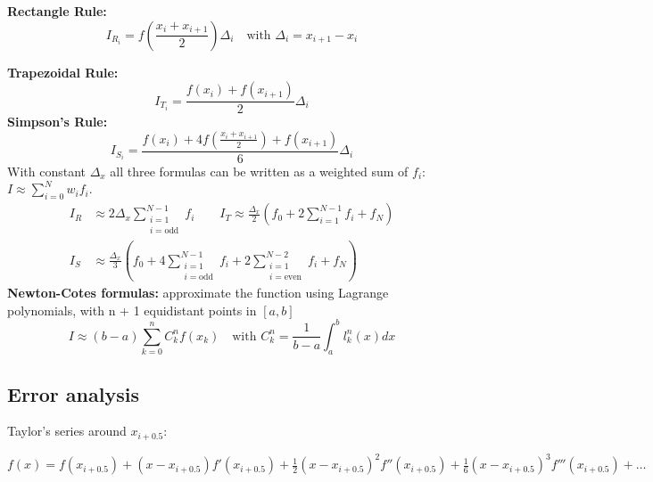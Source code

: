 \documentclass[8pt,a4paper]{scrartcl}
\begin{document}
\begin{multicols*}{3}
\textbf{Rectangle Rule:}\hfill {}
\begin{equation*}
I_{R_i} = f(\frac{x_i + x_{i+1}}{2}) \Delta_i \quad \text{with } \Delta_i = x_{i+1} - x_i
\end{equation*}

\textbf{Trapezoidal Rule:}
\begin{equation*}
I_{T_i} = \frac{f(x_i) + f(x_{i+1})}{2} \Delta_i 
\end{equation*}
\textbf{Simpson's Rule:}\hfill {}
\begin{equation*}
I_{S_i} = \frac{f(x_i) + 4f(\frac{x_i + x_{i+1}}{2}) + f(x_{i+1})}{6} \Delta_i 
\end{equation*}
With constant $\Delta_x$ all three formulas can be written as a weighted sum of $f_i$: $I \approx \sum_{i=0}^{N} w_i f_i$.
\begin{align*}
I_R&\approx 2\Delta_x\sum_{\substack{i=1\\i=\text{odd}}}^{N-1} f_i\qquad I_T \approx \frac{\Delta_x}{2} \left( f_0 + 2 \sum_{i=1}^{N-1} f_i + f_N \right) \\
I_S &\approx \frac{\Delta_x}{3} \left( f_0 + 4 \sum_{\substack{i=1\\i=\text{odd}}}^{N-1} f_i + 2 \sum_{\substack{i=1\\i=\text{even}}}^{N-2} f_i + f_N \right)
\end{align*}
\textbf{Newton-Cotes formulas:} approximate the function using Lagrange polynomials, with n + 1 equidistant points in $[a,b]$
\begin{equation*}
I \approx (b-a) \sum_{k=0}^{n} C_k^n f(x_k) \quad \text{with } C_k^n = \frac{1}{b-a} \int_a^b l_k^n(x) dx
\end{equation*}




\subsection{Error analysis}

Taylor's series around $x_{i+0.5}$:

$f(x) = f(x_{i+0.5}) + (x - x_{i+0.5})f'(x_{i+0.5}) + \frac{1}{2}(x-x_{i+0.5})^2 f''(x_{i+0.5})+ \frac{1}{6} (x-x_{i+0.5})^3 f''' (x_{i+0.5}) + \dots$


\end{multicols*}
\end{document}
